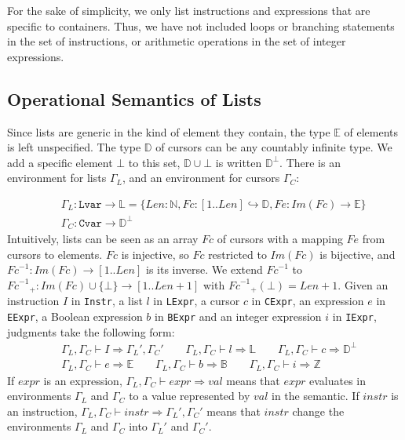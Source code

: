 \documentclass[runningheads,a4paper]{llncs}
\newcommand{\envL}{\ensuremath{\Gamma_L}\xspace}
\newcommand{\envC}{\ensuremath{\Gamma_C}\xspace}
\newcommand{\eval}{\envL, \envC \vdash}
\newcommand{\Fc}{\ensuremath{\mathit{Fc}}\xspace}
\newcommand{\FcInv}{\ensuremath{\mathit{Fc}^{-1}}\xspace}
\newcommand{\Fe}{\ensuremath{\mathit{Fe}}\xspace}
\newcommand{\ImFc}{\ensuremath{\mathit{Im}(\Fc)}\xspace}
\newcommand{\TypL}{\ensuremath{\mathbb{L}}\xspace}
\newcommand{\TypE}{\ensuremath{\mathbb{E}}\xspace}
\newcommand{\TypD}{\ensuremath{\mathbb{D}}\xspace}
\newcommand{\Nat}{\ensuremath{\mathbb{N}}\xspace}
\newcommand{\Int}{\ensuremath{\mathbb{Z}}\xspace}
\newcommand{\Bool}{\ensuremath{\mathbb{B}}\xspace}
\newcommand{\Len}{\ensuremath{\mathit{Len}}\xspace}
\newcommand{\beforesub}{\vspace{-0.2cm}}
\newcommand{\aftersub}{\vspace{-0.1cm}}
\begin{document}
For the sake of simplicity, we only list instructions and expressions that are
specific to containers. Thus, we have not included loops or branching
statements in the set of instructions, or arithmetic operations in the set of
integer expressions.

\beforesub
\subsection{Operational Semantics of Lists}
\aftersub

Since lists are generic in the kind of element they contain, the type \TypE of
elements is left unspecified. The type \TypD of cursors can be any countably infinite type.
We add a specific element $\bot$ to this set, $\TypD\cup\bot$ is written $\TypD^\bot$.
There is an environment for lists \envL, and an
environment for cursors \envC:

\begin{eqnarray*}
&&\envL : \texttt{Lvar} \rightarrow \TypL = \{\Len
: \Nat, \Fc : [1 .. \Len] \hookrightarrow \TypD, \Fe : \ImFc
\rightarrow \TypE\} \\
&&\envC : \texttt{Cvar} \rightarrow \TypD^\bot
\end{eqnarray*}
Intuitively, lists can be seen as an array $\Fc$ of cursors with a mapping
$\Fe$ from cursors to elements. \Fc is injective, so \Fc restricted to \ImFc is
bijective, and $\FcInv:\ImFc \rightarrow[1 .. \Len]$ is its inverse. We
extend \FcInv to $\FcInv_+: \ImFc\cup \{\bot\} \rightarrow [1 .. \Len+1]$
with $\FcInv_+(\bot)=\Len+1$.
Given an instruction $I$ in \texttt{Instr}, a list $l$ in \texttt{LExpr}, a
cursor $c$ in \texttt{CExpr}, an expression $e$ in \texttt{EExpr}, a Boolean
expression $b$ in \texttt{BExpr} and an integer expression $i$ in
\texttt{IExpr}, judgments take the following form:
\begin{eqnarray*}
&\eval I \Rightarrow \envL',\envC' 
\qquad \eval l \Rightarrow \TypL
\qquad \eval c \Rightarrow \TypD^\bot\\
&\eval e \Rightarrow \TypE
\qquad \eval b \Rightarrow\Bool
\qquad \eval i \Rightarrow\Int
\end{eqnarray*}
If $\mathit{expr}$ is an expression, $\eval \mathit{expr} \Rightarrow \mathit{val}$
means that $\mathit{expr}$ evaluates in environments $\envL$ and $\envC$ to a
value represented by $\mathit{val}$ in the semantic. 
If $\mathit{instr}$ is an instruction, $\eval \mathit{instr} \Rightarrow \envL',\envC'$
means that $instr$ change the environments $\envL$ and $\envC$ into $\envL'$ and $\envC'$.
\end{document}

